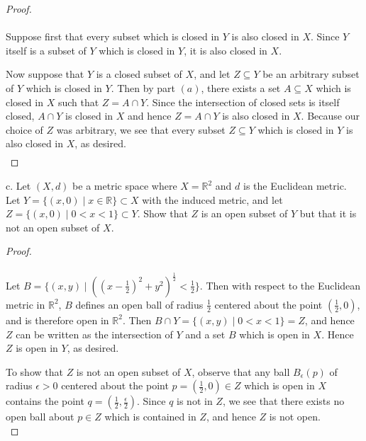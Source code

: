 \begin{proof}\renewcommand{\qedsymbol}{}\ \\\\
    Suppose first that every subset which is closed in $Y$ is also closed in $X$. Since $Y$ itself is a subset of $Y$ 
    which is closed in $Y$, it is also closed in $X$.

    Now suppose that $Y$ is a closed subset of $X$, and let $Z \subseteq Y$ be an arbitrary subset of $Y$ which is 
    closed in $Y$. Then by part $(a)$, there exists a set $A \subseteq X$ which is closed in $X$ such that 
    $Z = A \cap Y$. Since the intersection of closed sets is itself closed, $A \cap Y$ is closed in $X$
    and hence $Z = A \cap Y$ is also closed in $X$. Because our choice of $Z$ was arbitrary, we see that every
    subset $Z \subseteq Y$ which is closed in $Y$ is also closed in $X$, as desired.
    \begin{align*}
    \end{align*}
\end{proof}

\pagebreak
c.  Let $(X, d)$ be a metric space where $X = \mathbb{R}^2$ and $d$ is the Euclidean metric. Let 
    $Y = \{(x, 0) \mid x \in \mathbb{R} \} \subset X$ with the induced metric, and let 
    $Z = \{(x, 0) \mid 0 < x < 1 \} \subset Y$. Show that $Z$ is an open subset of $Y$ but that it is not an open subset
    of $X$.

\begin{proof}\ \\\\
    Let $B = \{(x, y) \mid \left((x - \frac{1}{2})^2 + y^2 \right)^{\frac{1}{2}} < \frac{1}{2} \}$. Then with respect to
    the Euclidean metric in $\mathbb{R}^2$, $B$ defines an open ball of radius $\frac{1}{2}$ centered about the point 
    $(\frac{1}{2}, 0)$, and is therefore open in $\mathbb{R}^2$. Then $B \cap Y = \{ (x, y) \mid 0 < x < 1 \} = Z$, and 
    hence $Z$ can be written as the intersection of $Y$ and a set $B$ which is open in $X$. Hence $Z$ is open in $Y$,
    as desired.

    To show that $Z$ is not an open subset of $X$, observe that any ball $B_\epsilon(p)$ of radius
    $\epsilon > 0$ centered about the point $p = (\frac{1}{2}, 0) \in Z$ which is open in $X$ contains the point
    $q = (\frac{1}{2}, \frac{\epsilon}{2})$. Since $q$ is not in $Z$, we see that there exists no open ball about 
    $p \in Z$ which is contained in $Z$, and hence $Z$ is not open.
    \ \\
\end{proof}

\pagebreak